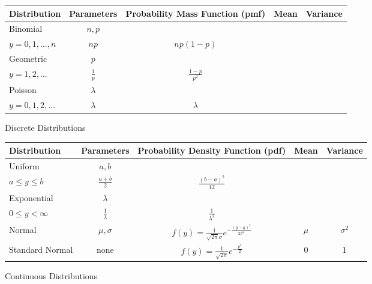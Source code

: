 \documentclass[12pt]{article}
\begin{document}
\pagebreak 


\begin{figure}[H]
\caption{Discrete Distributions}
\begin{tabular}{l c c c c}
\hline
Distribution & Parameters & Probability Mass Function (pmf) & Mean & Variance \\
\hline
Binomial & $n, p$ & \makecell{ $\displaystyle p(y) = \binom{n}{y}p^y(1-p)^{n-y}$\\$ \displaystyle y = 0, 1, \dots, n$} & $np$ & $np(1-p)$ \\
Geometric & $p$ & \makecell{ $\displaystyle p(y) = (1-p)^{y-1}p$ \\ $y = 1, 2, \dots$} & $ \displaystyle \frac{1}{p}$ & $\displaystyle \frac{1 - p}{p^2}$ \\
Poisson & $\lambda$ & \makecell{ $\displaystyle p(y) = \frac{e^{-\lambda} \lambda^y }{y!}$ \\ $y = 0, 1, 2, \dots$ } & $\lambda$ & $\lambda$ \\
\end{tabular}
\end{figure}

\vspace{2cm}

\begin{figure}[H]
\caption{Continuous Distributions}
\begin{tabular}{l c c c c}
\hline
Distribution & Parameters & Probability Density Function (pdf) & Mean & Variance \\
\hline
Uniform & $a, b$ & \makecell{ $\displaystyle f(y) = \frac{1}{b-a}$ \\ $a \leq y \leq b$ }& $\displaystyle \frac{a + b}{2}$ & $\displaystyle \frac{(b - a)^2}{12}$ \\
Exponential & $\lambda$ & \makecell{ $\displaystyle f(y) = \lambda e^{-\lambda y}$ \\ $0 \leq y < \infty$} & $\displaystyle \frac{1}{\lambda}$ & $\displaystyle \frac{1}{\lambda^2}$ \\
Normal & $\mu, \sigma$ & $\displaystyle f(y) = \frac{1}{\sqrt{2 \pi}\sigma}e^{- \frac{(y - \mu)^2}{2 \sigma^2}}$ & $\mu$ & $\sigma^2$ \\
Standard Normal & none & $\displaystyle f(y) = \frac{1}{\sqrt{2 \pi}}e^{- \frac{y^2}{2}}$ & $0$ & $1$ \\
\end{tabular}
\end{figure}
\end{document}

